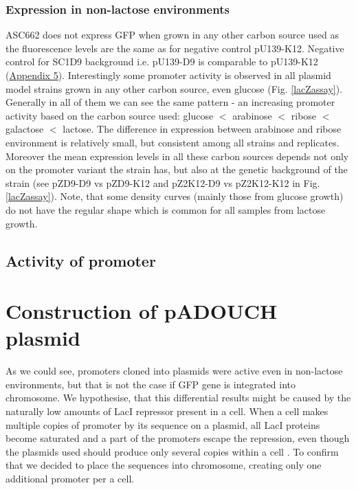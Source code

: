 \subsubsection{Expression in non-lactose environments}
ASC662 does not express GFP when grown in any other carbon source used as the fluorescence levels are the same as for negative control pU139-K12.
Negative control for SC1\textunderscore D9 background i.e. pU139-D9 is comparable to pU139-K12 (\hyperlink{FCnegs}{Appendix 5}).
Interestingly some  promoter activity is observed in all plasmid model strains grown in any other carbon source, even glucose (Fig. \ref{lacZassay}).
Generally in all of them we can see the same pattern - an increasing  promoter activity based on the carbon source used: glucose $<$ arabinose $<$ ribose $<$ galactose $<$ lactose.
The difference in expression between arabinose and ribose environment is relatively small, but consistent among all strains and replicates.
Moreover the mean expression levels in all these carbon sources depends not only on the promoter variant the strain has, but also at the genetic background of the strain (see pZ\textunderscore D9-D9 vs pZ\textunderscore D9-K12 and pZ2\textunderscore K12-D9 vs pZ2\textunderscore K12-K12 in Fig. \ref{lacZassay}).
Note, that some density curves (mainly those from glucose growth) do not have the regular shape which is common for all samples from lactose growth.

\subsection{Activity of  promoter}



\section{Construction of pADOUCH plasmid}
As we could see,  promoters cloned into plasmids were active even in non-lactose environments, but that is not the case if GFP gene is integrated into chromosome.
We hypothesise, that this differential results might be caused by the naturally low amounts of LacI repressor present in a cell.
When a cell makes multiple copies of  promoter by its sequence on a plasmid, all LacI proteins become saturated and a part of the promoters escape the repression, even though the plasmids used should produce only several copies within a cell \cite{zaslaver2006comprehensive}.
To confirm that we decided to place the  sequences into chromosome, creating only one additional  promoter per a cell.

